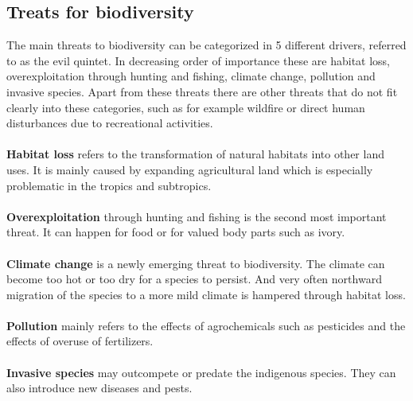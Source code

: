 \documentclass[../summary.tex]{subfiles}
\begin{document}
	\subsection{Treats for biodiversity} 
	The main threats to biodiversity can be categorized in 5 different drivers, referred to as the evil quintet. In decreasing order of importance these are habitat loss, overexploitation through hunting and fishing, climate change, pollution and invasive species. Apart from these threats there are other threats that do not fit clearly into these categories, such as for example wildfire or direct human disturbances due to recreational activities.
	\\
	\\
	\textbf{Habitat loss} refers to the transformation of natural habitats into other land uses. It is mainly caused by expanding agricultural land which is especially problematic in the tropics and subtropics.
	\\
	\\
	\textbf{Overexploitation} through hunting and fishing is the second most important threat. It can happen for food or for valued body parts such as ivory.
	\\
	\\
	\textbf{Climate change} is a newly emerging threat to biodiversity. The climate can become too hot or too dry for a species to persist. And very often northward migration of the species to a more mild climate is hampered through habitat loss.
	\\
	\\
	\textbf{Pollution} mainly refers to the effects of agrochemicals such as pesticides and the effects of overuse of fertilizers.
	\\
	\\
	\textbf{Invasive species} may outcompete or predate the indigenous species. They can also introduce new diseases and pests.
\end{document}
